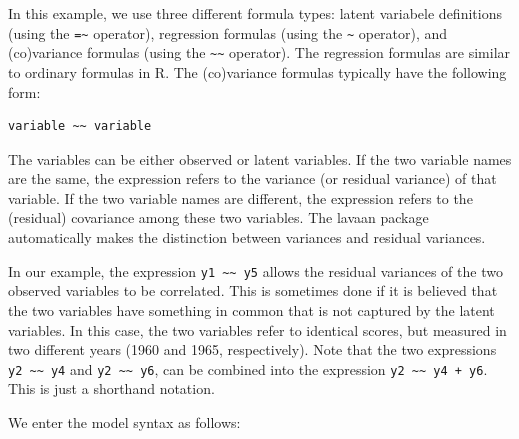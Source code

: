 In this example, we use three different formula types: latent variabele
definitions (using the \texttt{=\textasciitilde{}} operator), regression
formulas (using the \texttt{\textasciitilde{}} operator), and
(co)variance formulas (using the
\texttt{\textasciitilde{}\textasciitilde{}} operator). The regression
formulas are similar to ordinary formulas in R. The (co)variance
formulas typically have the following form:

\begin{verbatim}
variable ~~ variable
\end{verbatim}

The variables can be either observed or latent variables. If the two
variable names are the same, the expression refers to the variance (or
residual variance) of that variable. If the two variable names are
different, the expression refers to the (residual) covariance among
these two variables. The lavaan package automatically makes the
distinction between variances and residual variances.

In our example, the expression
\texttt{y1 \textasciitilde{}\textasciitilde{} y5} allows the residual
variances of the two observed variables to be correlated. This is
sometimes done if it is believed that the two variables have something
in common that is not captured by the latent variables. In this case,
the two variables refer to identical scores, but measured in two
different years (1960 and 1965, respectively). Note that the two
expressions \texttt{y2 \textasciitilde{}\textasciitilde{} y4} and
\texttt{y2 \textasciitilde{}\textasciitilde{} y6}, can be combined into
the expression \texttt{y2 \textasciitilde{}\textasciitilde{}~y4 + y6}.
This is just a shorthand notation.

We enter the model syntax as follows:

\begin{Shaded}
\begin{Highlighting}[]
\end{Highlighting}
\end{Shaded}

